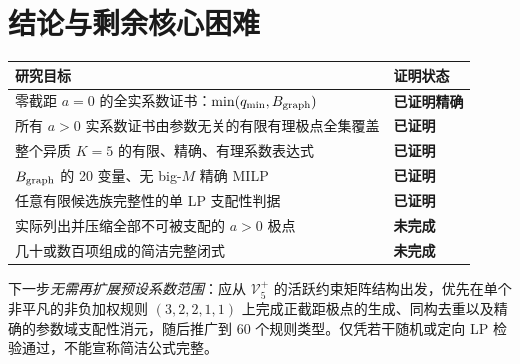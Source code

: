 \documentclass[11pt,a4paper]{ctexart}
\theoremstyle{definition}
\newcommand{\calV}{\mathcal V}
\begin{document}
\section{结论与剩余核心困难}
\begin{center}
\small
\begin{tabularx}{\textwidth}{@{}p{}X@{}}
\toprule
\textbf{研究目标} & \textbf{证明状态}\\
\midrule
零截距 $a=0$ 的全实系数证书：$\min(q_{\min},B_{\rm graph})$ & \textbf{已证明精确}\\
所有 $a>0$ 实系数证书由参数无关的有限有理极点全集覆盖 & \textbf{已证明}\\
整个异质 $K=5$ 的有限、精确、有理系数表达式 & \textbf{已证明}\\
$B_{\rm graph}$ 的 20 变量、无 big-$M$ 精确 MILP & \textbf{已证明}\\
任意有限候选族完整性的单 LP 支配性判据 & \textbf{已证明}\\
实际列出并压缩全部不可被支配的 $a>0$ 极点 & \textbf{未完成}\\
几十或数百项组成的简洁完整闭式 & \textbf{未完成}\\
\bottomrule
\end{tabularx}
\end{center}
\noindent 下一步\emph{无需再扩展预设系数范围}：应从 $\calV_5^+$ 的活跃约束矩阵结构出发，优先在单个非平凡的非负加权规则 $(3,2,2,1,1)$ 上完成正截距极点的生成、同构去重以及精确的参数域支配性消元，随后推广到 60 个规则类型。仅凭若干随机或定向 LP 检验通过，不能宣称简洁公式完整。

\appendix
\end{document}
